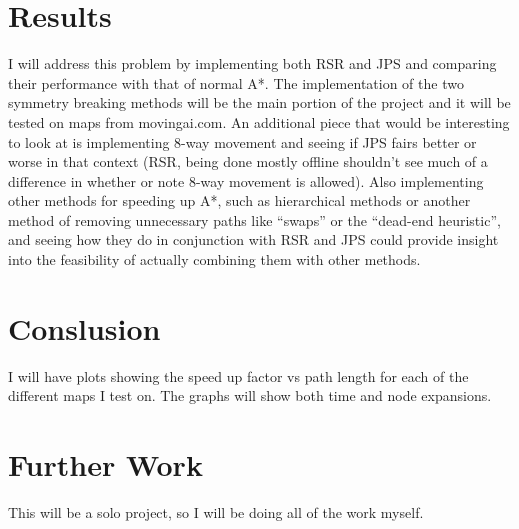 \documentclass[12pt]{article}
\begin{document}
\section{Results}
I will address this problem by implementing both RSR and JPS and comparing their performance with that of normal A*. The implementation of the two symmetry
breaking methods will be the main portion of the project and it will be tested on maps from movingai.com. An additional piece that would be interesting to 
look at is implementing 8-way movement and seeing if JPS fairs better or worse in that context (RSR, being done mostly offline shouldn't see much of a 
difference in whether or note 8-way movement is allowed). Also implementing other methods for speeding up A*, such as hierarchical methods or another method of
removing unnecessary paths like ``swaps'' or the ``dead-end heuristic'', and seeing how they do in conjunction with RSR and JPS could provide insight into 
the feasibility of actually combining them with other methods.

\section{Conslusion}
I will have plots showing the speed up factor vs path length for each of the different maps I test on. The graphs will show both time and node expansions.

\section{Further Work}
This will be a solo project, so I will be doing all of the work myself.



\end{document}
